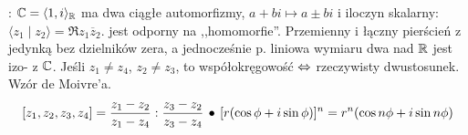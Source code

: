 :  $\mathbb{C} = \langle 1, i \rangle_{\mathbb{R}}$ ma dwa ciągłe automorfizmy, $a+bi \mapsto a \pm bi$ i iloczyn skalarny: $\langle z_1 \mid z_2 \rangle = \Re z_1 \overline z_2$.
 jest odporny na ,,homomorfie''.
Przemienny i łączny pierścień z jedynką bez dzielników zera, a jednocześnie p. liniowa wymiaru dwa nad $\mathbb{R}$ jest izo- z $\mathbb{C}$.
Jeśli $z_1 \neq z_4$, $z_2 \neq z_3$, to współokręgowość $\Leftrightarrow$ rzeczywisty dwustosunek.
Wzór de Moivre'a.
\[
	[z_1, z_2, z_3, z_4] = \frac{z_1 - z_2}{z_1-z_4} : \frac{z_3-z_2}{z_3-z_4} \, \bullet \,
	[r(\cos \phi + i \sin \phi)]^n = r^n(\cos n\phi + i \sin n \phi)
\]
